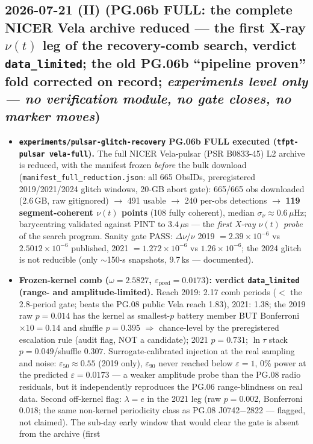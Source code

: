 \subsection*{2026-07-21 (II) (PG.06b FULL: the complete NICER Vela archive reduced --- the first X-ray $\nu(t)$ leg of the recovery-comb search, verdict \texttt{data\_limited}; the old PG.06b ``pipeline proven'' fold corrected on record; \emph{experiments level only --- no verification module, no gate closes, no marker moves})}
\begin{itemize}[leftmargin=1.5em]
\item \textbf{\texttt{experiments/pulsar-glitch-recovery} PG.06b FULL executed (\texttt{tfpt-pulsar vela-full}).}
The full NICER Vela-pulsar (PSR B0833-45) L2 archive is reduced, with the manifest frozen \emph{before} the
bulk download (\texttt{manifest\_full\_reduction.json}: all 665 ObsIDs, preregistered 2019/2021/2024 glitch
windows, 20-GB abort gate): 665/665 obs downloaded (2.6\,GB, raw gitignored) $\to$ 491 usable $\to$ 240
per-obs detections $\to$ \textbf{119 segment-coherent $\nu(t)$ points} (108 fully coherent), median
$\sigma_\nu\approx0.6\,\mu$Hz; barycentring validated against PINT to $3.4\,\mu$s --- the \emph{first
X-ray $\nu(t)$ probe} of the search program. Sanity gate PASS: $\Delta\nu/\nu$ 2019 $=2.39\times10^{-6}$
vs $2.5012\times10^{-6}$ published, 2021 $=1.272\times10^{-6}$ vs $1.26\times10^{-6}$; the 2024 glitch is
not reducible (only $\sim$150-s snapshots, 9.7\,ks --- documented).
\item \textbf{Frozen-kernel comb ($\omega=2.5827$, $\varepsilon_{\mathrm{pred}}=0.0173$): verdict
\texttt{data\_limited} (range- and amplitude-limited).} Reach 2019: 2.17 comb periods ($<$ the 2.8-period
gate; beats the PG.08 public Vela reach 1.83), 2021: 1.38; the 2019 raw $p=0.014$ has the kernel as
smallest-$p$ battery member BUT Bonferroni $\times10=0.14$ and shuffle $p=0.395$ $\Rightarrow$ chance-level
by the preregistered escalation rule (audit flag, NOT a candidate); 2021 $p=0.731$; $\ln\tau$ stack
$p=0.049$/shuffle $0.307$. Surrogate-calibrated injection at the real sampling and noise:
$\varepsilon_{50}\approx0.55$ (2019 only), $\varepsilon_{90}$ never reached below $\varepsilon=1$, 0\% power
at the predicted $\varepsilon=0.0173$ --- a weaker amplitude probe than the PG.08 radio residuals, but it
independently reproduces the PG.06 range-blindness on real data. Second off-kernel flag: $\lambda=e$ in the
2021 leg (raw $p=0.002$, Bonferroni $0.018$; the same non-kernel periodicity class as PG.08 J0742$-$2822 ---
flagged, not claimed). The sub-day early window that would clear the gate is absent from the archive (first

\end{itemize}
